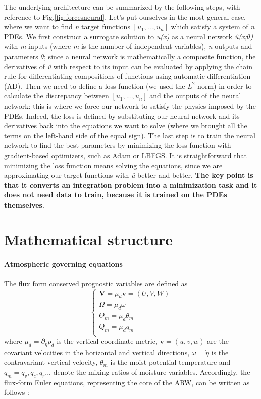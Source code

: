 \documentclass{juliacon}
\begin{document}
The underlying architecture can be summarized by the following steps, with reference to Fig.\ref{fig:forcesneural}. Let's put ourselves in the most general case, where we want to find \textit{n} target functions $[u_1,...,u_n]$ which satisfy a system of \textit{n} PDEs. We first construct a surrogate solution to \textit{u(x)} as a neural network \textit{\^{u}(x;$\theta$)} with \textit{m} inputs (where \textit{m} is the number of independent variables), \textit{n} outputs and parameters $\theta$; since a neural network is mathematically a composite function, the derivatives of \textit{\^{u}} with respect to its input can be evaluated by applying the chain rule for differentiating compositions of functions using automatic differentiation (AD). Then we need to define a loss function (we used the $L^2$ norm) in order to calculate the discrepancy between $[u_1,...,u_n]$ and the outputs of the neural network: this is where we force our network to satisfy the physics imposed by the PDEs. Indeed, the loss is defined by substituting our neural network and its derivatives back into the equations we want to solve (where we brought all the terms on the left-hand side of the equal sign). The last step is to train the neural network to find the best parameters by minimizing the loss function with gradient-based optimizers, such as Adam or LBFGS. It is straightforward that minimizing the loss function means solving the equations, since we are approximating our target functions with \textit{\^{u}} better and better. \textbf{The key point is that it converts an integration problem into a minimization task and it does not need data to train, because it is trained on the PDEs themselves}. 


\section{Mathematical structure} 
\paragraph{Atmospheric governing equations}
The flux form conserved prognostic variables are defined as
\begin{equation} \label{prognostic variables}
    \begin{cases}
    \textbf{V} = \mu_d\textbf{v} = (U,V,W) \\
    \Omega = \mu_d\omega \\
    \Theta_m = \mu_d\theta_m \\
    Q_m = \mu_dq_m \\
    \end{cases}
\end{equation}
where $\mu_d = \partial_\eta p_d$ is the vertical coordinate metric, $\textbf{v} = (u,v,w)$ are the covariant velocities in the horizontal and vertical directions, $\omega = \dot{\eta}$ is the contravariant vertical velocity, $ \theta_m $ is the moist potential temperature and $q_m = q_v,q_c,q_r...$ denote the mixing ratios of moisture variables.
Accordingly, the flux-form Euler equations, representing the core of the ARW, can be written as follows \cite{ARW-WRF}:
\vspace{1mm}
\end{document}
